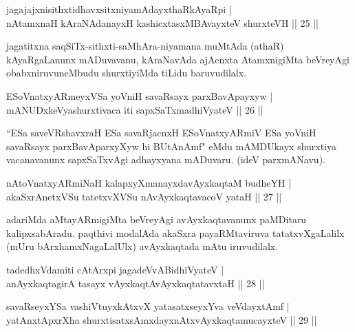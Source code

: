 
\begin{shl}
jagajajxnisithxtidhavxsitxniyamAdayxthaRkAyaRpi |\\
nA\s \s tamxnaH kAraNAdanayxH kashicxtasxMBAvayxteV shurxteVH \hfill || 25 ||
\end{shl}

\begin{artha}
jagatitxna saqSiTx-sithxti-saMhAra-niyamana muMtAda (athaR) kAyaRgaLanunx mADuvavanu, kAraNavAda ajAcnxta AtamxnigiMta beVreyAgi obabxniruvuneMbudu shurxtiyiMda tiLidu baruvudilalx.
\end{artha}


\begin{shl}
ESoV\s natxyARmeyxVSa yoVniH savaRsayx parxBavApayxyw |\\
mANUDxkeVyashurxtivaca iti sapxSaTxmadhiVyateV \hfill || 26 ||
\end{shl}

\begin{artha}
``ESa saveVRshavxraH ESa savaRjacnxH ESoV\s natxyARmiV ESa yoVniH savaRsayx parxBavAparxyXyw hi BUtAnAmf" eMdu mAMDUkayx shurxtiya vacanavanunx sapxSaTxvAgi adhayxyana mADuvaru. (ideV parxmANavu).
\end{artha}

\begin{shl}
nAtoV\s natxyARmiNaH kalapxyXmanayxdavAyxkaqtaM budheYH |\\
akaSxrAnetxVSu tatetxvXVSu nAvAyxkaqtavacoV yataH \hfill || 27 ||
\end{shl}

\begin{artha}
adariMda aMtayARmigiMta beVreyAgi avAyxkaqtavanunx paMDitaru kalipxsabAradu. paqthivi modalAda akaSxra payaRMtaviruva tatatxvXgaLalilx (mUru bArxhamxNagaLalUlx) avAyxkaqtada mAtu iruvudilalx.
\end{artha}

\begin{shl}
tadedhxVdamiti cAtArxpi jagadeVvABidhiVyateV |\\
anAyxkaqtagirA tasayx vAyxkaqtAvAyxkaqtatavxtaH \hfill || 28 ||
\end{shl}

\begin{shl}
savaRseyxYSa vashiVtuyxkAtxvX yatasatxseyxYva veVdayxtAmf |\\
yatAnxtApxrXha shurxtisatxsAmxdayxnAtx\s vAyxkaqtamucayxteV \hfill || 29 ||
\end{shl}

